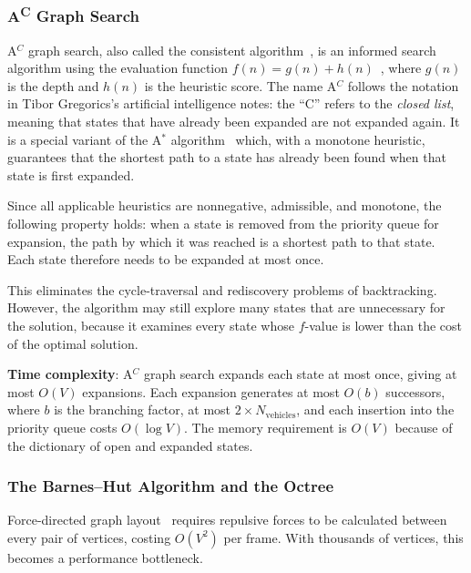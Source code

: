 \subsubsection{A\textsuperscript{C} Graph Search}
\label{sec:graphsearch}

A$^C$ graph search, also called the consistent algorithm~\cite[Chapter~4.4]{gregorics_2006_bevezetes}, is an informed search algorithm using the evaluation function $f(n) = g(n) + h(n)$~\cite[p.~16]{gregorics_grafker}, where $g(n)$ is the depth and $h(n)$ is the heuristic score. The name A$^C$ follows the notation in Tibor Gregorics's artificial intelligence notes: the \enquote{C} refers to the \emph{closed list}, meaning that states that have already been expanded are not expanded again. It is a special variant of the A$^*$ algorithm~\cite{hart1968astar} which, with a monotone heuristic, guarantees that the shortest path to a state has already been found when that state is first expanded.

Since all applicable heuristics are nonnegative, admissible, and monotone, the following property holds: when a state is removed from the priority queue for expansion, the path by which it was reached is a shortest path to that state. Each state therefore needs to be expanded at most once.~\cite[p.~16]{gregorics_grafker}

This eliminates the cycle-traversal and rediscovery problems of backtracking. However, the algorithm may still explore many states that are unnecessary for the solution, because it examines every state whose $f$-value is lower than the cost of the optimal solution.

\textbf{Time complexity}: A$^C$ graph search expands each state at most once, giving at most $O(V)$ expansions. Each expansion generates at most $O(b)$ successors, where $b$ is the branching factor, at most $2 \times N_{\text{vehicles}}$, and each insertion into the priority queue costs $O(\log V)$. The memory requirement is $O(V)$ because of the dictionary of open and expanded states.

\subsubsection{The Barnes--Hut Algorithm and the Octree}
\label{sec:barneshut}

Force-directed graph layout~\cite{fruchterman1991graph} requires repulsive forces to be calculated between every pair of vertices, costing $O(V^2)$ per frame. With thousands of vertices, this becomes a performance bottleneck.

